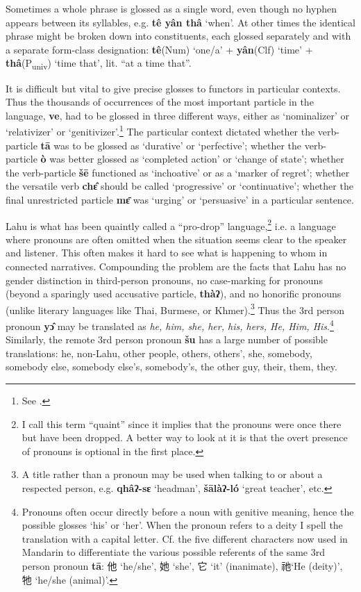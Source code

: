 Sometimes a whole phrase is glossed as a single word, even though no
hyphen appears between its syllables, e.g. \textbf{tê yân thâ} `when'.
At other times the identical phrase might be broken down into
constituents, each glossed separately and with a separate form-class
designation: \textbf{tê}(Num) `one/a' + \textbf{yân}(Clf) `time' +
\textbf{thâ}(P\textsubscript{univ}) `time that', lit. ``at a time that''.

It is difficult but vital to give precise glosses to functors in
particular contexts. Thus the thousands of occurrences of the most
important particle in the language, \textbf{ve}, had to be glossed in
three different ways, either as `nominalizer' or `relativizer' or
`genitivizer'.\footnote{See \citet{matisoff1972}.} The particular context
dictated whether the verb-particle \textbf{tā} was to be glossed as
`durative' or `perfective'; whether the verb-particle \textbf{ò} was
better glossed as `completed action' or `change of state'; whether the
verb-particle \textbf{šē} functioned as `inchoative' or as a `marker of
regret'; whether the versatile verb \textbf{chɛ̂} should be called
`progressive' or `continuative'; whether the final unrestricted particle
\textbf{mɛ̄} was `urging' or `persuasive' in a particular sentence.

Lahu is what has been quaintly called a ``pro-drop''
language,\footnote{I call this term ``quaint'' since it implies that
  the pronouns were once there but have been dropped. A better way to
  look at it is that the overt presence of pronouns is optional in the
  first place.} i.e. a language where pronouns are often omitted when
the situation seems clear to the speaker and listener. This often
makes it hard to see what is happening to whom in connected
narratives. Compounding the problem are the facts that Lahu has no
gender distinction in third-person pronouns, no case-marking for
pronouns (beyond a sparingly used accusative particle, \textbf{thàʔ}),
and no honorific pronouns (unlike literary languages like Thai,
Burmese, or Khmer).\footnote{A title rather than a pronoun may be used
  when talking to or about a respected person, e.g. \textbf{qhâʔ-sɛ}
  `headman', \textbf{šālàʔ-ló} `great teacher', etc. } Thus the 3rd
person pronoun \textbf{yɔ̂ }may be translated as \emph{he, him, she,
  her, his, hers, He, Him, His}.\footnote{Pronouns often occur
  directly before a noun with genitive meaning, hence the possible
  glosses `his' or `her'.  When the pronoun refers to a deity I spell
  the translation with a capital letter. Cf. the five different
  characters now used in Mandarin to differentiate the various
  possible referents of the same 3rd person pronoun
  \textbf{tā}: 他 `he/she', 她 `she', 它 `it' (inanimate), 祂`He
  (deity)', 牠 `he/she (animal)'.} Similarly, the remote 3rd person
pronoun \textbf{šu }has a large number of possible
translations: he, non-Lahu, other people,
others, others', she, somebody, somebody else, somebody else's,
somebody's, the other guy, their, them, they.

